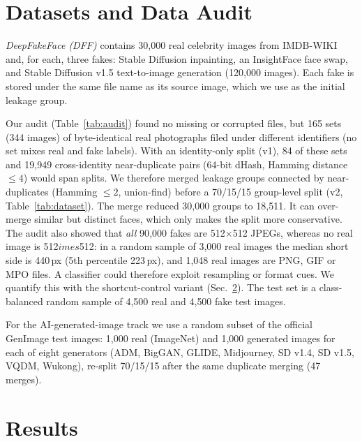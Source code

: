 \documentclass[conference]{IEEEtran}
\begin{document}
\section{Datasets and Data Audit}
\textit{DeepFakeFace (DFF)} \cite{song2023dff} contains 30{,}000 real celebrity images from IMDB-WIKI \cite{rothe2018imdbwiki} and, for each, three fakes: Stable Diffusion inpainting, an InsightFace \cite{deng2019arcface} face swap, and Stable Diffusion v1.5 \cite{rombach2022ldm} text-to-image generation (120{,}000 images). Each fake is stored under the same file name as its source image, which we use as the initial leakage group.

Our audit (Table~\ref{tab:audit}) found no missing or corrupted files, but 165 sets (344 images) of byte-identical real photographs filed under different identifiers (no set mixes real and fake labels). With an identity-only split (v1), 84 of these sets and 19{,}949 cross-identity near-duplicate pairs (64-bit dHash, Hamming distance $\le4$) would span splits. We therefore merged leakage groups connected by near-duplicates (Hamming $\le2$, union-find) before a 70/15/15 group-level split (v2, Table~\ref{tab:dataset}). The merge reduced 30{,}000 groups to 18{,}511. It can over-merge similar but distinct faces, which only makes the split more conservative. The audit also showed that \emph{all} 90{,}000 fakes are 512$\times$512 JPEGs, whereas no real image is 512$	imes$512: in a random sample of 3{,}000 real images the median short side is 440\,px (5th percentile 223\,px), and 1{,}048 real images are PNG, GIF or MPO files. A classifier could therefore exploit resampling or format cues. We quantify this with the shortcut-control variant (Sec.~\ref{sec:results}). The test set is a class-balanced random sample of 4{,}500 real and 4{,}500 fake test images.

For the AI-generated-image track we use a random subset of the official GenImage \cite{zhu2023genimage} test images: 1{,}000 real (ImageNet) and 1{,}000 generated images for each of eight generators (ADM, BigGAN, GLIDE, Midjourney, SD v1.4, SD v1.5, VQDM, Wukong), re-split 70/15/15 after the same duplicate merging (47 merges).




\section{Results}\label{sec:results}
\end{document}
